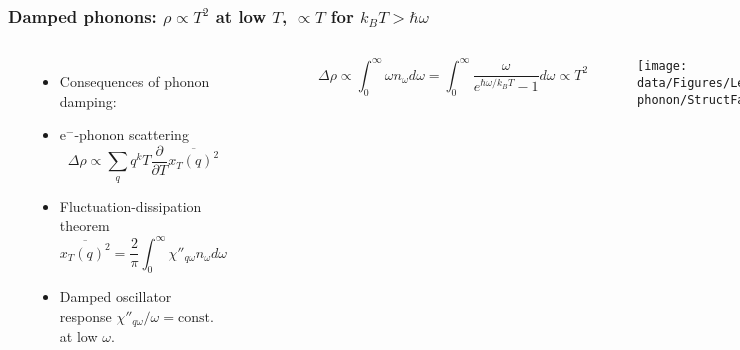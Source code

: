 \begin{frame}[label=T2Origin]
\frametitle{Damped phonons: $\rho \propto T^2$ at low $T$, $\propto T$ for $k_B T>\hbar \omega$}

\begin{columns}[t]
\centerline{~}
\vspace{-1.5em}
\begin{itemize}
\item Consequences of phonon damping:
\item
e$^-$-phonon scattering
\[
\Delta\rho \propto \sum_q q^k T \frac{\partial}{\partial T} \overline{x_T(q)^2}
\]
\item
Fluctuation-dissipation theorem 
\[
\overline{x_T(q)^2} = \frac{2}{\pi}\int_0^\infty \chi''_{q\omega} n_{\omega} d\omega
\]

\item
Damped oscillator response $\chi''_{q\omega}/\omega =\text{const.}$ at low $\omega$.

\end{itemize}
\vspace{1em}
\[
\hspace{5em}\Delta\rho \propto \int_0^\infty \omega n_\omega d\omega = \int_0^\infty \frac{\omega}{e^{\hbar \omega/k_B T}-1} d\omega \propto T^2
\]


\centerline{~}
\centerline{\texttt{[image: \\data/Figures/Lectures/e-phonon/StructFact.pdf]}}

\end{columns}
\end{frame}


